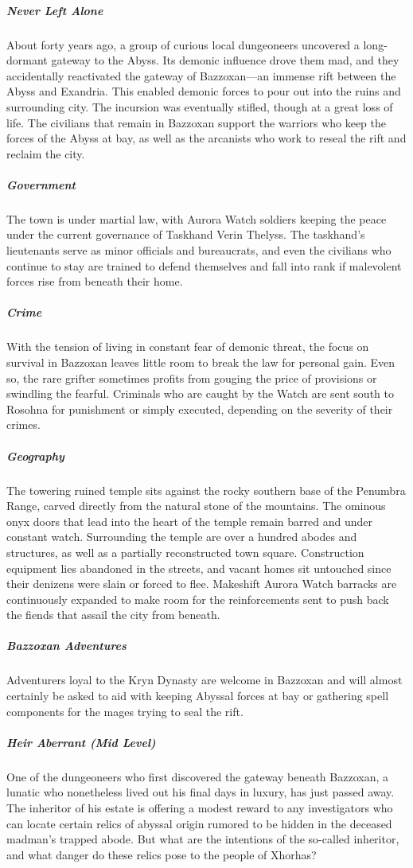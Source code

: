 \documentclass[10pt,a4paper,twoside,bg=print,twocolumn,openany,nodeprecatedcode]{dndbook}
\begin{document}
\subparagraph{Never Left Alone}
About forty years ago, a group of curious local dungeoneers uncovered a long-dormant gateway to the Abyss. Its demonic influence drove them mad, and they accidentally reactivated the gateway of Bazzoxan—an immense rift between the Abyss and Exandria. This enabled demonic forces to pour out into the ruins and surrounding city. The incursion was eventually stifled, though at a great loss of life. The civilians that remain in Bazzoxan support the warriors who keep the forces of the Abyss at bay, as well as the arcanists who work to reseal the rift and reclaim the city.

\subparagraph{Government}
The town is under martial law, with Aurora Watch soldiers keeping the peace under the current governance of Taskhand Verin Thelyss. The taskhand's lieutenants serve as minor officials and bureaucrats, and even the civilians who continue to stay are trained to defend themselves and fall into rank if malevolent forces rise from beneath their home.

\subparagraph{Crime}
With the tension of living in constant fear of demonic threat, the focus on survival in Bazzoxan leaves little room to break the law for personal gain. Even so, the rare grifter sometimes profits from gouging the price of provisions or swindling the fearful. Criminals who are caught by the Watch are sent south to Rosohna for punishment or simply executed, depending on the severity of their crimes.

\subparagraph{Geography}
The towering ruined temple sits against the rocky southern base of the Penumbra Range, carved directly from the natural stone of the mountains. The ominous onyx doors that lead into the heart of the temple remain barred and under constant watch. Surrounding the temple are over a hundred abodes and structures, as well as a partially reconstructed town square. Construction equipment lies abandoned in the streets, and vacant homes sit untouched since their denizens were slain or forced to flee. Makeshift Aurora Watch barracks are continuously expanded to make room for the reinforcements sent to push back the fiends that assail the city from beneath.

\subparagraph{Bazzoxan Adventures}
Adventurers loyal to the Kryn Dynasty are welcome in Bazzoxan and will almost certainly be asked to aid with keeping Abyssal forces at bay or gathering spell components for the mages trying to seal the rift.

\subparagraph{Heir Aberrant (Mid Level)}
One of the dungeoneers who first discovered the gateway beneath Bazzoxan, a lunatic who nonetheless lived out his final days in luxury, has just passed away. The inheritor of his estate is offering a modest reward to any investigators who can locate certain relics of abyssal origin rumored to be hidden in the deceased madman's trapped abode. But what are the intentions of the so-called inheritor, and what danger do these relics pose to the people of Xhorhas?
\end{document}
